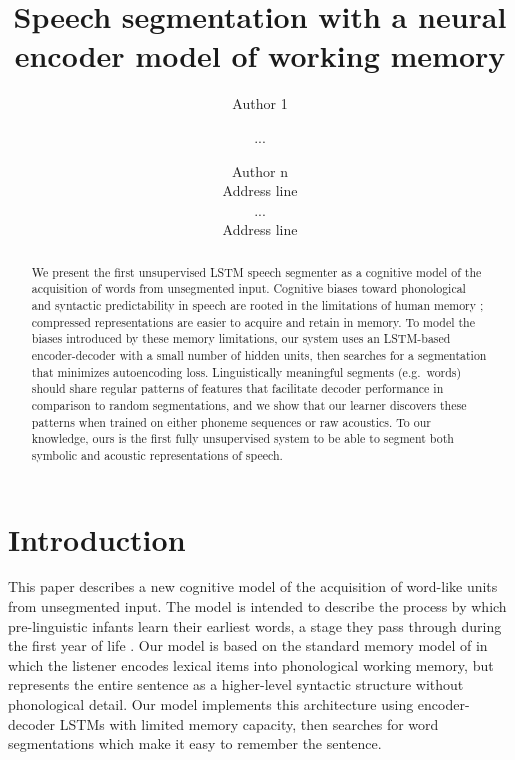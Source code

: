 \documentclass[11pt,letterpaper]{article}
\title{Speech segmentation with a neural encoder model of working memory}
\author{Author 1 \and ... \and Author n \\
        Address line \\ ... \\ Address line}
\date{}
\begin{document}
\maketitle

\begin{abstract}
We present the first unsupervised LSTM speech segmenter as a cognitive model of the acquisition of words from unsegmented input.
Cognitive biases toward phonological and syntactic predictability in speech are rooted in the limitations of human memory \cite{Baddeley98};
compressed representations are easier to acquire and retain in memory.
To model the biases introduced by these memory limitations, our system uses an LSTM-based encoder-decoder with a small number of hidden units,
then searches for a segmentation that minimizes autoencoding loss.
Linguistically meaningful segments (e.g.\ words) should share regular patterns of features that facilitate decoder performance in comparison to random segmentations,
and we show that our learner discovers these patterns when trained on either phoneme sequences or raw acoustics.
To our knowledge, ours is the first fully unsupervised system to be able to segment both symbolic and acoustic representations of speech.
\end{abstract}


\section{Introduction}

This paper describes a new cognitive model of the acquisition of
word-like units from unsegmented input. The model is intended to
describe the process by which pre-linguistic infants learn their
earliest words, a stage they pass through during the first year of
life \cite{Jusczyk95,Bergelson12}. Our model is based on the standard
memory model of  in which the listener encodes
lexical items into phonological working memory, but represents the
entire sentence as a higher-level syntactic structure without
phonological detail. Our model implements this architecture using
encoder-decoder LSTMs with limited memory capacity, then searches for
word segmentations which make it easy to remember the sentence.
\end{document}
